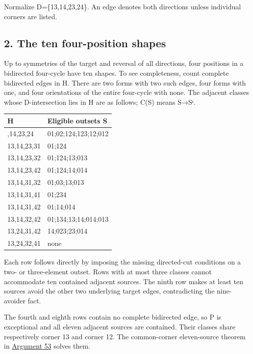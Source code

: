 \documentclass[
  10pt,
]{article}
\begin{document}
Normalize D=\{13,14,23,24\}. An edge denotes both directions unless
individual corners are listed.

\hypertarget{the-ten-four-position-shapes}{%
\subsection*{2. The ten four-position
shapes}\label{the-ten-four-position-shapes}}

Up to symmetries of the target and reversal of all directions, four
positions in a bidirected four-cycle have ten shapes. To see
completeness, count complete bidirected edges in H. There are two forms
with two such edges, four forms with one, and four orientations of the
entire four-cycle with none. The adjacent classes whose D-intersection
lies in H are as follows; C(S) means S→Sᶜ.

\begin{longtable}[]{@{}ll@{}}
\toprule\noalign{}
H & Eligible outsets S \\
\midrule\noalign{}
\endhead
\bottomrule\noalign{}
\endlastfoot
13,14,23,24 & 01;02;124;123;12;012 \\
13,14,23,31 & 01;124 \\
13,14,23,32 & 01;124;13;013 \\
13,14,23,42 & 01;124;14;014 \\
13,14,31,32 & 01;03;13;013 \\
13,14,31,41 & 01;234 \\
13,14,31,42 & 01;14;014 \\
13,14,32,42 & 01;134;13;14;014;013 \\
13,24,31,42 & 14;023;23;014 \\
13,24,32,41 & none \\
\end{longtable}

Each row follows directly by imposing the missing directed-cut
conditions on a two- or three-element outset. Rows with at most three
classes cannot accommodate ten contained adjacent sources. The ninth row
makes at least ten sources avoid the other two underlying target edges,
contradicting the nine-avoider fact.

The fourth and eighth rows contain no complete bidirected edge, so P is
exceptional and all eleven adjacent sources are contained. Their classes
share respectively corner 13 and corner 12. The common-corner
eleven-source theorem in \protect\hyperlink{arg-53}{Argument 53} solves
them.
\end{document}
